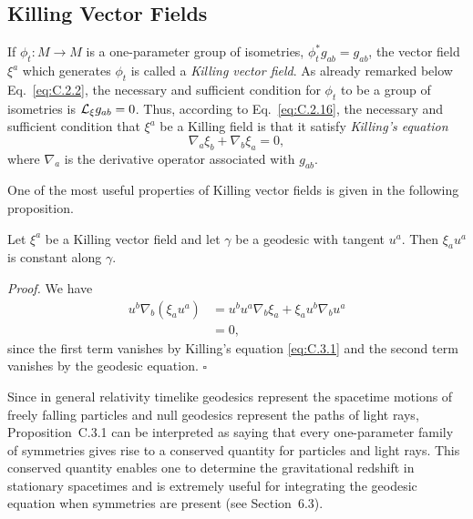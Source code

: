 
\subsection{Killing Vector Fields}\label{sec:C.3}

If \(\phi_t:M\to M\) is a one-parameter group of isometries,
\(\phi_t^*g_{ab}=g_{ab}\), the vector field \(\xi^a\) which generates \(\phi_t\) is
called a \emph{Killing vector field}. As already remarked below Eq.~\eqref{eq:C.2.2},
the necessary and sufficient condition for \(\phi_t\) to be a group of isometries is
\(\mathcal{L}_\xi g_{ab}=0\). Thus, according to Eq.~\eqref{eq:C.2.16}, the necessary and
sufficient condition that \(\xi^a\) be a Killing field is that it satisfy
\emph{Killing's equation}
\begin{equation}
  \nabla_a\xi_b+\nabla_b\xi_a=0,
  \tag{C.3.1}\label{eq:C.3.1}
\end{equation}
where \(\nabla_a\) is the derivative operator associated with \(g_{ab}\).

One of the most useful properties of Killing vector fields is given in the following
proposition.

\begin{proposition}\label{prop:C.3.1}
Let \(\xi^a\) be a Killing vector field and let \(\gamma\) be a geodesic with tangent
\(u^a\). Then \(\xi_au^a\) is constant along \(\gamma\).
\end{proposition}

\noindent\emph{Proof.} We have
\begin{equation}
\begin{aligned}
  u^b\nabla_b(\xi_au^a)
  &=u^bu^a\nabla_b\xi_a+\xi_au^b\nabla_bu^a\\
  &=0,
\end{aligned}
  \tag{C.3.2}\label{eq:C.3.2}
\end{equation}
since the first term vanishes by Killing's equation \eqref{eq:C.3.1} and the second
term vanishes by the geodesic equation. \(\square\)

Since in general relativity timelike geodesics represent the spacetime motions of
freely falling particles and null geodesics represent the paths of light rays,
Proposition~C.3.1 can be interpreted as saying that every one-parameter family of
symmetries gives rise to a conserved quantity for particles and light rays. This
conserved quantity enables one to determine the gravitational redshift in stationary
spacetimes and is extremely useful for integrating the geodesic equation when
symmetries are present (see Section~6.3).


